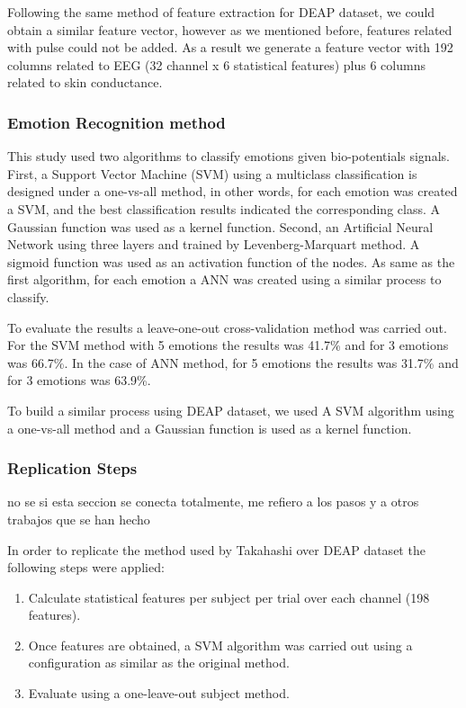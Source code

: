 \documentclass{sig-alternate}
\begin{document}
Following the same method of feature extraction for DEAP dataset, 
we could obtain a similar feature vector, however as we mentioned before, 
features related with pulse could not be added. As a result we generate 
a feature vector with 192 columns related to EEG (32 channel x 6 statistical 
features) plus 6 columns related to skin conductance.

\subsubsection{Emotion Recognition method}

This study used two algorithms to classify emotions given bio-potentials signals.
First, a Support Vector Machine (SVM) using a multiclass classification is designed under 
a one-vs-all method, in other words, for each emotion was created a SVM, and the best
classification results indicated the corresponding class. A Gaussian function was used as a kernel function.
Second, an Artificial Neural Network using three layers and trained by Levenberg-Marquart method.
A sigmoid function was used as an activation function of the nodes. As same as the first algorithm,
for each emotion a ANN was created using a similar process to classify.

To evaluate the results a leave-one-out cross-validation method was carried out. 
For the SVM method with 5 emotions the results was 41.7\% and for 3 emotions was 66.7\%.
In the case of ANN method, for 5 emotions the results was 31.7\% and for 3 emotions was
63.9\%.   

To build a similar process using DEAP dataset, we used A SVM algorithm using a
one-vs-all method and a Gaussian function is used as a kernel function. 

\subsubsection{Replication Steps}
{\color{red} no se si esta seccion se conecta totalmente, me refiero a los pasos y a
otros trabajos que se han hecho}

In order to replicate the method used by Takahashi over DEAP dataset the following 
steps were applied:
\begin{enumerate}
\item Calculate statistical features per subject per trial over each channel (198 features).
\item Once features are obtained, a SVM algorithm was carried out using a configuration 
as similar as the original method.
\item Evaluate using a one-leave-out subject method. 
\end{enumerate}
\end{document}
